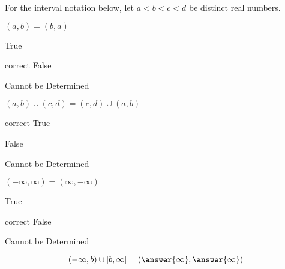 \documentclass{ximera}
\author{Lee Wayand}
\begin{document}
For the interval notation below, let $a < b < c < d$ be distinct real numbers. \\



\begin{exercise}

$(a, b) = (b, a)$

\begin{multipleChoice}
\item {True}
\item [correct]{False}
\item {Cannot be Determined}
\end{multipleChoice}

\end{exercise}




\begin{exercise}

$(a, b) \cup (c, d) = (c, d) \cup (a, b)$

\begin{multipleChoice}
\item [correct]{True}
\item {False}
\item {Cannot be Determined}
\end{multipleChoice}

\end{exercise}





\begin{exercise}

$(-\infty, \infty) = (\infty, -\infty)$

\begin{multipleChoice}
\item {True}
\item [correct]{False}
\item {Cannot be Determined}
\end{multipleChoice}

\end{exercise}






\begin{exercise}
\[
(-\infty, b) \cup [b, \infty] = \left( \answer{\infty}, \answer{\infty} \right)
\]
\end{exercise}
\end{document}
